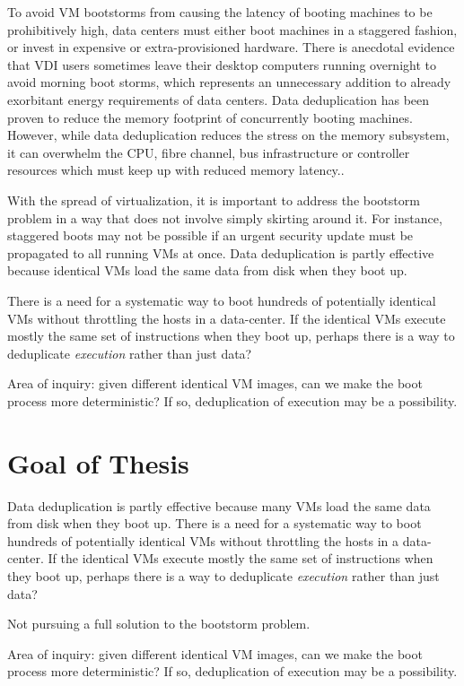 To avoid VM bootstorms from causing the latency of booting machines
to be prohibitively high, data centers must either 
boot machines in a staggered fashion, or invest in expensive 
or extra-provisioned hardware. There is anecdotal evidence
that VDI users sometimes leave their desktop computers running
overnight to avoid morning boot storms, which
represents an unnecessary addition to already exorbitant
energy requirements of data centers. Data deduplication \cite{clements2009deduplication} 
has been proven to reduce the memory footprint of concurrently
booting machines. However, while data deduplication reduces
the stress on the memory subsystem, it can overwhelm the CPU, 
fibre channel, bus infrastructure or controller resources 
which must keep up with reduced memory latency.\cite{netappstorm}. 

With the spread of virtualization, it is important to address the
bootstorm problem in a way that does not involve simply skirting around it. 
For instance, staggered boots may not be 
possible if an urgent security update must be propagated to
all running VMs at once. Data deduplication is partly effective because 
identical VMs load the same data from disk when they boot up.  

There is a need 
for a systematic way to boot hundreds of potentially
identical VMs without throttling the hosts in a data-center.
If the identical VMs execute mostly the same set of instructions when they boot up,
perhaps there is a way to deduplicate \emph{execution} rather than just data?

Area of inquiry: given different identical VM images, can we 
make the boot process more deterministic? If so, 
deduplication of execution may be a possibility.
\section{Goal of Thesis}

Data deduplication is partly effective because many VMs load
the same data from disk when they boot up.  There is a need 
for a systematic way to boot hundreds of potentially
identical VMs without throttling the hosts in a data-center.
If the identical VMs execute mostly the same set of instructions when they boot up,
perhaps there is a way to deduplicate \emph{execution} rather than just data?

Not pursuing a full solution to the bootstorm problem.

Area of inquiry: given different identical VM images, can we 
make the boot process more deterministic? If so, 
deduplication of execution may be a possibility.

